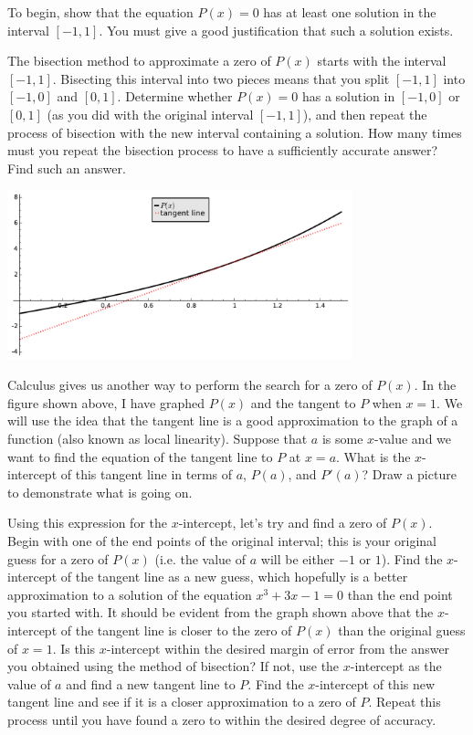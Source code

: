 \documentclass
[justified,nohyper]
{tufte-handout}
\theoremstyle{mydef}
\begin{document}
To begin, show that the equation $P(x)=0$ has at least one solution in the interval $[-1,1]$. You must give a good justification that such a solution exists.

The bisection method to approximate a zero of $P(x)$ starts with the interval $[-1,1]$. Bisecting this interval into two pieces means that you split $[-1,1]$ into $[-1,0]$ and $[0,1]$. Determine whether $P(x)=0$ has a solution in $[-1,0]$ or $[0,1]$ (as you did with the original interval $[-1,1]$), and then repeat the process of bisection with the new interval containing a solution. How many times must you repeat the bisection process to have a sufficiently accurate answer? Find such an answer.

\newpage

\includegraphics[width=10cm]{p_of_x.pdf}

Calculus gives us another way to perform the search for a zero of $P(x)$. In the figure shown above, I have graphed $P(x)$ and the tangent to $P$ when $x=1$. We will use the idea that the tangent line is a good approximation to the graph of a function (also known as local linearity). Suppose that $a$ is some $x$-value and we want to find the equation of the tangent line to $P$ at $x=a$. What is the $x$-intercept of this tangent line in terms of $a$, $P(a)$, and $P'(a)$? Draw a picture to demonstrate what is going on.

Using this expression for the $x$-intercept, let's try and find a zero of $P(x)$. Begin with one of the end points of the original interval; this is your original guess for a zero of $P(x)$ (i.e. the value of $a$ will be either $-1$ or $1$). Find the $x$-intercept of the tangent line as a new guess, which hopefully is a better approximation to a solution of the equation $x^3+3x-1=0$ than the end point you started with. It should be evident from the graph shown above that the $x$-intercept of the tangent line is closer to the zero of $P(x)$ than the original guess of $x=1$. Is this $x$-intercept within the desired margin of error from the answer you obtained using the method of bisection? If not, use the $x$-intercept as the value of $a$ and find a new tangent line to $P$. Find the $x$-intercept of this new tangent line and see if it is a closer approximation to a zero of $P$. Repeat this process until you have found a zero to within the desired degree of accuracy.
\end{document}
